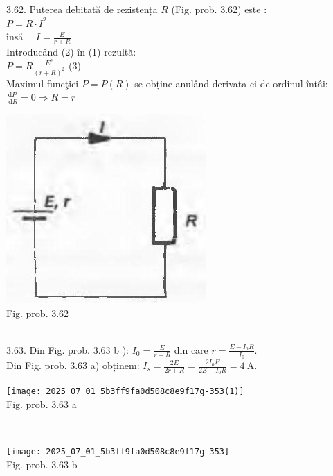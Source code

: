 3.62. Puterea debitată de rezistența $R$ (Fig. prob. 3.62) este :\\ $P=R \cdot I^{2} \tag{1}$\\ însă $\quad I=\frac{E}{r+R}$\\ Introducând (2) în (1) rezultă:\\ $P=R \frac{E^{2}}{(r+R)^{2}}$ (3)\\ Maximul funcţiei $P=P(R)$ se obține anulând derivata ei de ordinul întâi:\\ $\frac{\mathrm{d} P}{\mathrm{~d} R}=0 \Rightarrow R=r$\\ \begin{center} \includegraphics[max width=\textwidth]{images/2025_07_01_5b3ff9fa0d508c8e9f17g-353(2)}\\ Fig. prob. 3.62 \end{center}\\

3.63. Din Fig. prob. 3.63 b ): $I_{0}=\frac{E}{r+R}$ din care $r=\frac{E-I_{0} R}{I_{0}}$.\\ Din Fig. prob. 3.63 a) obținem: $I_{s}=\frac{2 E}{2 r+R}=\frac{2 I_{0} E}{2 E-I_{0} R}=4 \mathrm{~A}$.\\ \begin{center} \texttt{[image: 2025\_07\_01\_5b3ff9fa0d508c8e9f17g-353(1)]}\\ Fig. prob. 3.63 a \end{center}\\ \begin{center} \texttt{[image: 2025\_07\_01\_5b3ff9fa0d508c8e9f17g-353]}\\ Fig. prob. 3.63 b \end{center}\\

